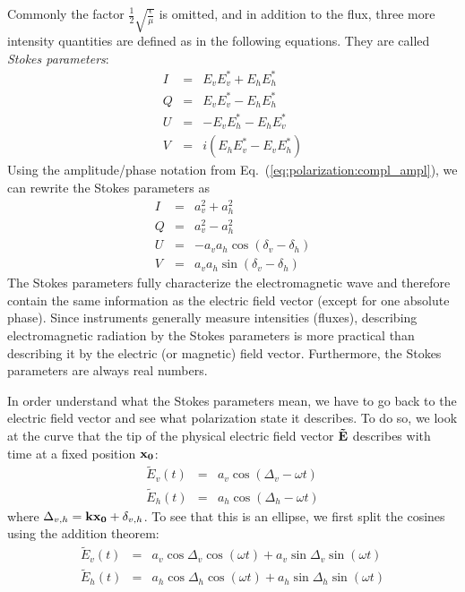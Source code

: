 Commonly the factor  $\frac{1}{2}\sqrt{\frac{\epsilon}{\mu}}$ is
omitted, and in addition to the flux, three more intensity quantities
are defined as in the following equations. They are called 
\emph{Stokes parameters}:
\begin{eqnarray}
  \label{eq:polarization:stokesparam_I}
  I &=&   E_v E_v^\ast + E_h E_h^\ast \\
  \label{eq:polarization:stokesparam_Q}
  Q &=&   E_v E_v^\ast - E_h E_h^\ast \\
  \label{eq:polarization:stokesparam_U}
  U &=& - E_v E_h^\ast - E_h E_v^\ast \\
  \label{eq:polarization:stokesparam_V}
  V &=& i(E_h E_v^\ast - E_v E_h^\ast)
\end{eqnarray}
Using the amplitude/phase notation from
Eq.~(\ref{eq:polarization:compl_ampl}),
we can rewrite the Stokes parameters as 
\begin{eqnarray}
  \label{eq:polarization:stokesparam_alt_I}
 I &=& a_v^2 + a_h^2\\
  \label{eq:polarization:stokesparam_alt_Q}
 Q &=& a_v^2 - a_h^2\\
  \label{eq:polarization:stokesparam_alt_U}
 U &=&  - a_v a_h \cos(\delta_v-\delta_h)\\
  \label{eq:polarization:stokesparam_alt_V}
 V &=&   a_v a_h \sin(\delta_v-\delta_h)
\end{eqnarray}
The Stokes parameters fully characterize the electromagnetic wave and
therefore contain the same information as the electric field vector
(except for one absolute phase).  Since instruments generally measure
intensities (fluxes), describing electromagnetic radiation by the
Stokes parameters is more practical than describing it by the electric
(or magnetic) field vector. Furthermore, the Stokes parameters are
always real numbers.

 
In order understand what the Stokes parameters mean, we have to go
back to the electric field vector and see what polarization state it
describes.  To do so, we look at the curve that the tip of the
physical electric field vector $\mathbf{\tilde{E}}$ describes with
time at a fixed position $\mathbf{x_0}$:
\begin{eqnarray}
  \tilde{E}_v (t) &=& a_v \cos(\Delta_v - \omega t)\\
  \tilde{E}_h (t) &=& a_h \cos(\Delta_h - \omega t)
\end{eqnarray}
where $\Delta_{v,h} = \mathbf{k}\mathbf{x_0} + \delta_{v,h}$. 
To see that this is an ellipse, we first split the cosines using
the addition theorem:
\begin{eqnarray}
  \label{eq:polarization:tip_of_fieldvec1}
  \tilde{E}_v (t) &=&   a_v \cos\Delta_v \cos(\omega t)
                      + a_v \sin\Delta_v \sin(\omega t)\\
  \label{eq:polarization:tip_of_fieldvec2}
  \tilde{E}_h (t) &=&   a_h \cos\Delta_h \cos(\omega t)
                      + a_h \sin\Delta_h \sin(\omega t)
\end{eqnarray}

